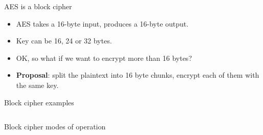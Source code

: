 \documentclass[aspectratio=169, lualatex, handout]{beamer}
\begin{document}
\begin{frame}{AES is a block cipher}
	\begin{itemize}[<+->]
		\item AES takes a 16-byte input, produces a 16-byte output.
		\item Key can be 16, 24 or 32 bytes.
		\item OK, so what if we want to encrypt more than 16 bytes?
		\item \textbf{Proposal}: split the plaintext into 16 byte chunks, encrypt
		      each of them with the same key.
	\end{itemize}
\end{frame}

\begin{frame}{Block cipher examples}
	\begin{columns}
		\begin{column}{0.33\textwidth}
		\end{column}
		\pause
		\begin{column}{0.33\textwidth}
		\end{column}
		\pause
		\begin{column}{0.33\textwidth}
		\end{column}
	\end{columns}
\end{frame}

\begin{frame}{Block cipher modes of operation}
\end{frame}
\end{document}
